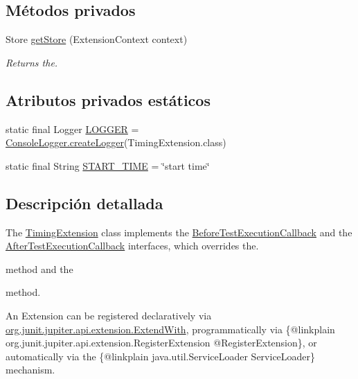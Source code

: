 \subsection*{Métodos privados}
\begin{DoxyCompactItemize}
\item 
Store \mbox{\hyperlink{a00268_a489c3097fd687a25391189f3fec56fa8}{get\+Store}} (Extension\+Context context)
\begin{DoxyCompactList}\small\item\em Returns the. \end{DoxyCompactList}\end{DoxyCompactItemize}
\subsection*{Atributos privados estáticos}
\begin{DoxyCompactItemize}
\item 
static final Logger \mbox{\hyperlink{a00268_a6c2790b974e4ae4484a4ad0f67ead486}{L\+O\+G\+G\+ER}} = \mbox{\hyperlink{a00220_a520321643663e37d95761134a35505cd}{Console\+Logger.\+create\+Logger}}(Timing\+Extension.\+class)
\item 
static final String \mbox{\hyperlink{a00268_ad283289939c7b6e42277a8b06db6a765}{S\+T\+A\+R\+T\+\_\+\+T\+I\+ME}} = \char`\"{}start time\char`\"{}
\end{DoxyCompactItemize}


\subsection{Descripción detallada}
The \mbox{\hyperlink{a00268}{Timing\+Extension}} class implements the \mbox{\hyperlink{}{Before\+Test\+Execution\+Callback}} and the \mbox{\hyperlink{}{After\+Test\+Execution\+Callback}} interfaces, which overrides the. 


\begin{DoxyCode}{0}
\end{DoxyCode}
 method and the
\begin{DoxyCode}{0}
\end{DoxyCode}
 method. 

An Extension can be registered {\ttfamily declaratively} via \mbox{\hyperlink{}{org.\+junit.\+jupiter.\+api.\+extension.\+Extend\+With}}, {\ttfamily programmatically} via \{@linkplain org.\+junit.\+jupiter.\+api.\+extension.\+Register\+Extension @\+Register\+Extension\}, or {\ttfamily automatically} via the \{@linkplain java.\+util.\+Service\+Loader Service\+Loader\} mechanism.

